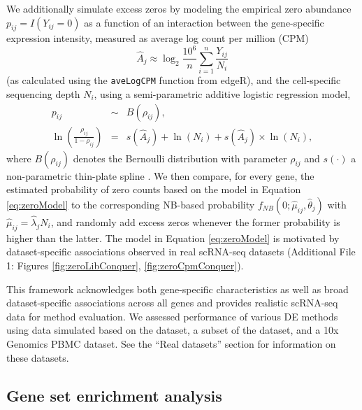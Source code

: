 \documentclass{bmcart}
\newcommand{\RPack}[1]{\textsf{#1}}
\newcommand{\RObj}[1]{\texttt{#1}}
\begin{document}
We additionally simulate excess zeros by modeling the empirical zero abundance $p_{ij} = I(Y_{ij}=0)$   
as a function of an interaction between the gene-specific expression intensity, measured as average log count per million 
(CPM) 
$$\hat A_j \approx \log_2 \frac{10^6}{n} \sum_{i=1}^n \frac{Y_{ij}}{N_i}$$ 
(as calculated using the \RObj{aveLogCPM} function from  \RPack{edgeR}), and the cell-specific sequencing depth $N_i$, using a semi-parametric additive logistic regression model,
\begin{eqnarray} \label{eq:zeroModel}
p_{ij} &\sim& B(\rho_{ij}),  \\
\ln \left ( \frac{\rho_{ij}}{1-\rho_{ij}} \right )  &=& s(\hat A_j) + \ln(N_i) + s(\hat A_j) \times \ln(N_i), \nonumber
\end{eqnarray} 
where $B(\rho_{ij})$ denotes the Bernoulli distribution with parameter $\rho_{ij}$ and $s(\cdot)$ a non-parametric thin-plate spline \citep{Wood2003}. 
We then compare, for every gene, the estimated probability of zero counts based on the model in Equation \eqref{eq:zeroModel} to the corresponding NB-based probability $f_{NB}(0;\hat \mu_{ij}, \hat \theta_j)$ with $\hat \mu_{ij} = \hat \lambda_j N_i$, and randomly add excess zeros whenever the former probability is higher than the latter. 
The model in Equation \eqref{eq:zeroModel} is motivated by dataset-specific associations observed in real scRNA-seq datasets (Additional File 1: Figures \ref{fig:zeroLibConquer}, \ref{fig:zeroCpmConquer}). 

This framework acknowledges both gene-specific characteristics as well as broad dataset-specific associations across all genes and provides realistic scRNA-seq data for method evaluation.
We assessed performance of various DE methods using data simulated based on the \citet{Islam2011} dataset, a subset of the \citet{Trapnell2013} dataset, and a 10x Genomics PBMC dataset. See the ``Real datasets'' section for information on these datasets.

\subsection*{Gene set enrichment analysis}
\end{document}
